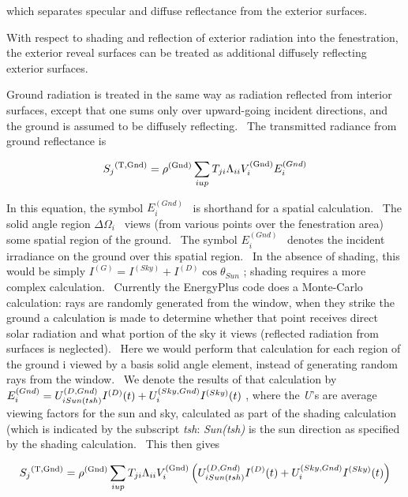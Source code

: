 which separates specular and diffuse reflectance from the exterior surfaces.

With respect to shading and reflection of exterior radiation into the fenestration, the exterior reveal surfaces can be treated as additional diffusely reflecting exterior surfaces.

Ground radiation is treated in the same way as radiation reflected from interior surfaces, except that one sums only over upward-going incident directions, and the ground is assumed to be diffusely reflecting.~ The transmitted radiance from ground reflectance is

\begin{equation}
{S_j}^{{\rm{(T, Gnd)}}} = {\rho ^{{\rm{(Gnd)}}}}\sum\limits_{i{\rm{ }}up} {{T_{ji}}{\Lambda_{ii}}V_i^{{\rm{(Gnd)}}}E_i^{(Gnd)}}
\end{equation}

In this equation, the symbol \(E_i^{(Gnd)}\) ~is shorthand for a spatial calculation.~ The solid angle region \(\Delta {\Omega_i}\) ~views (from various points over the fenestration area) some spatial region of the ground.~ The symbol \(E_i^{(Gnd)}\) ~denotes the incident irradiance on the ground over this spatial region.~ In the absence of shading, this would be simply \({I^{(G)}} = {I^{(Sky)}} + {I^{(D)}}\cos {\theta_{Sun}}\) ; shading requires a more complex calculation.~ Currently the EnergyPlus code does a Monte-Carlo calculation: rays are randomly generated from the window, when they strike the ground a calculation is made to determine whether that point receives direct solar radiation and what portion of the sky it views (reflected radiation from surfaces is neglected).~ Here we would perform that calculation for each region of the ground i viewed by a basis solid angle element, instead of generating random rays from the window.~ We denote the results of that calculation by \(E_i^{(Gnd)} = U_{i{\rm{ }}Sun(tsh)}^{(D,Gnd)}{I^{(D)}}(t) + U_i^{(Sky,Gnd)}{I^{(Sky)}}(t)\) , where the \emph{U}'s are average viewing factors for the sun and sky, calculated as part of the shading calculation (which is indicated by the subscript \emph{tsh}: \emph{Sun(tsh)} is the sun direction as specified by the shading calculation.~ This then gives

\begin{equation}
{S_j}^{{\rm{(T, Gnd)}}} = {\rho ^{{\rm{(Gnd)}}}}\sum\limits_{i{\rm{ }}up} {{T_{ji}}{\Lambda_{ii}}V_i^{{\rm{(Gnd)}}}\left( {U_{i{\rm{ }}Sun(tsh)}^{(D,Gnd)}{I^{(D)}}(t) + U_i^{(Sky,Gnd)}{I^{(Sky)}}(t)} \right)}
\end{equation}

